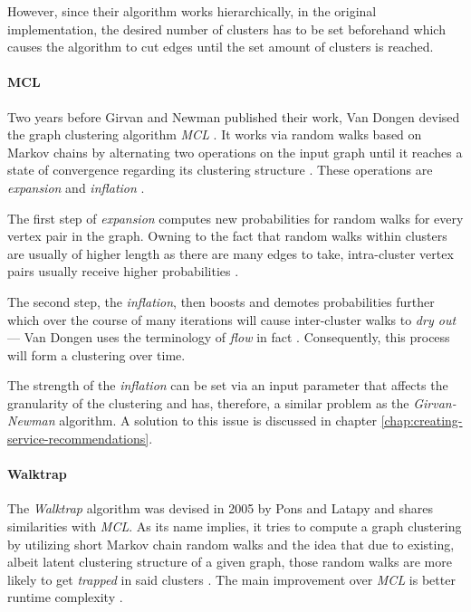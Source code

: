 \documentclass[12pt,a4paper]{report}
\begin{document}
However, since their algorithm works hierarchically, in the original
implementation, the desired number of clusters has to be set beforehand which
causes the algorithm to cut edges until the set amount of clusters is reached.

\paragraph{MCL \cite{vandongen2000graph}}
Two years before Girvan and Newman
published their work, Van Dongen devised the graph clustering algorithm \textit{
MCL} \cite{vandongen2000graph}. It works via random walks based on Markov
chains by alternating two operations on the input graph until it reaches a
state of convergence regarding its clustering structure \cite{
vandongen2000graph}. These operations are \textit{expansion} and
\textit{inflation} \cite{vandongen2000graph}.

The first step of \textit{expansion} computes new probabilities for random
walks for every vertex pair in the graph. Owning to the fact that random walks
within clusters are usually of higher length as there are many edges to take,
intra-cluster vertex pairs usually receive higher probabilities
\cite{vandongen2000graph}.

The second step, the \textit{inflation}, then boosts and demotes probabilities
further which over the course of many iterations will cause inter-cluster walks
to \textit{dry out} --- Van Dongen uses the terminology of \textit{flow} in
fact \cite{vandongen2000graph}. Consequently, this process will form a
clustering over time.

The strength of the \textit{inflation} can be set via an input parameter that
affects the granularity of the clustering and has, therefore, a similar problem
as the \textit{Girvan-Newman} algorithm. A solution to this issue is discussed
in chapter \ref{chap:creating-service-recommendations}.

\paragraph{Walktrap \cite{pons2005computing}}
The \textit{Walktrap} algorithm
was devised in 2005 by Pons and Latapy \cite{pons2005computing} and shares
similarities with \textit{MCL}. As its name implies, it tries to compute a
graph clustering by utilizing short Markov chain random walks and the idea that
due to existing, albeit latent clustering structure of a given graph, those
random walks are more likely to get \textit{trapped} in said clusters \cite{
pons2005computing}. The main improvement over \textit{MCL} is better runtime
complexity \cite{pons2005computing}.
\end{document}
